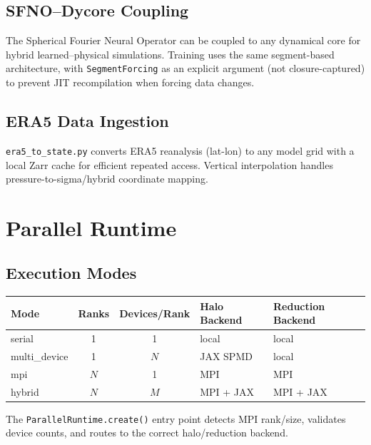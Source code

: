 \documentclass[11pt,twoside]{report}
\begin{document}
\section{SFNO--Dycore Coupling}

The Spherical Fourier Neural Operator can be coupled to any dynamical
core for hybrid learned--physical simulations.  Training uses the same
segment-based architecture, with \texttt{SegmentForcing} as an explicit
argument (not closure-captured) to prevent JIT recompilation when forcing
data changes.

\section{ERA5 Data Ingestion}

\texttt{era5\_to\_state.py} converts ERA5 reanalysis (lat-lon) to any
model grid with a local Zarr cache for efficient repeated access.
Vertical interpolation handles pressure-to-sigma/hybrid coordinate
mapping.


\chapter{Parallel Runtime}
\label{ch:parallel}

\section{Execution Modes}

\begin{center}
\begin{tabular}{lccll}
\toprule
Mode & Ranks & Devices/Rank & Halo Backend & Reduction Backend \\
\midrule
serial & 1 & 1 & local & local \\
multi\_device & 1 & $N$ & JAX SPMD & local \\
mpi & $N$ & 1 & MPI & MPI \\
hybrid & $N$ & $M$ & MPI + JAX & MPI + JAX \\
\bottomrule
\end{tabular}
\end{center}

The \texttt{ParallelRuntime.create()} entry point detects MPI rank/size,
validates device counts, and routes to the correct halo/reduction backend.
\end{document}
